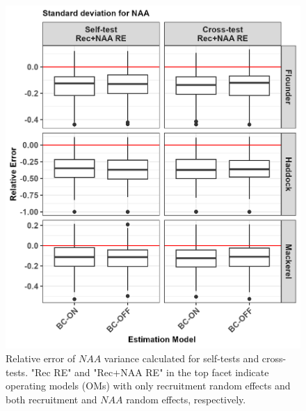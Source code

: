\documentclass[
  12pt,
]{article}
\begin{document}
\begin{figure}[H]
\centering
\includegraphics[width=\textwidth]{Original_Figures&Tables/NAA_sigma.PNG}
\caption{Relative error of $NAA$ variance calculated for self-tests and cross-tests. "Rec RE" and "Rec+NAA RE" in the top facet indicate operating models (OMs) with only recruitment random effects and both recruitment and $NAA$ random effects, respectively.}
\label{fig:NAA_sigma}
\end{figure}
\end{document}

